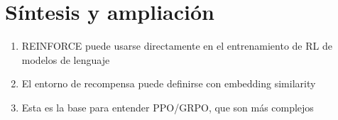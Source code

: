 \section{Síntesis y ampliación}
\begin{enumerate}
  \item REINFORCE puede usarse directamente en el entrenamiento de RL de modelos de lenguaje
  \item El entorno de recompensa puede definirse con embedding similarity
  \item Esta es la base para entender PPO/GRPO, que son más complejos
\end{enumerate}

